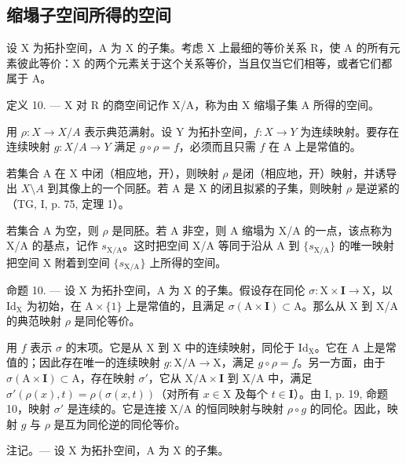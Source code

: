 \subsection{缩塌子空间所得的空间}

设 X 为拓扑空间，A 为 X 的子集。考虑 X 上最细的等价关系 R，使 A 的所有元素彼此等价：X 的两个元素关于这个关系等价，当且仅当它们相等，或者它们都属于 A。

定义 10. --- X 对 R 的商空间记作 X/A，称为由 X 缩塌子集 A 所得的空间。

用 \(\rho\colon X\to X/A\) 表示典范满射。设 Y 为拓扑空间，\(f\colon X\to Y\) 为连续映射。要存在连续映射 \(g\colon X/A\to Y\) 满足 \(g\circ\rho=f\)，必须而且只需 \(f\) 在 A 上是常值的。

若集合 A 在 X 中闭（相应地，开），则映射 \(\rho\) 是闭（相应地，开）映射，并诱导出 \(X\setminus A\) 到其像上的一个同胚。若 A 是 X 的闭且拟紧的子集，则映射 \(\rho\) 是逆紧的（TG, I, p. 75, 定理 1）。

若集合 A 为空，则 \(\rho\) 是同胚。若 A 非空，则 A 缩塌为 X/A 的一点，该点称为 X/A 的基点，记作 \(s_{\mathrm{X / A}}\)。这时把空间 X/A 等同于沿从 A 到 \(\{s_{\mathrm{X / A}}\}\) 的唯一映射把空间 X 附着到空间 \(\{s_{\mathrm{X / A}}\}\) 上所得的空间。

命题 10. --- 设 X 为拓扑空间，A 为 X 的子集。假设存在同伦 \(\sigma: \mathrm{X} \times \mathbf{I} \to \mathrm{X}\)，以 \(\mathrm{Id}_{\mathrm{X}}\) 为初始，在 \(\mathrm{A} \times \{1\}\) 上是常值的，且满足 \(\sigma(\mathrm{A} \times \mathbf{I}) \subset \mathrm{A}\)。那么从 X 到 X/A 的典范映射 \(\rho\) 是同伦等价。

用 \(f\) 表示 \(\sigma\) 的末项。它是从 X 到 X 中的连续映射，同伦于 \(\mathrm{Id}_{\mathrm{X}}\)。它在 A 上是常值的；因此存在唯一的连续映射 \(g \colon \mathrm{X} / \mathrm{A} \to \mathrm{X}\)，满足 \(g \circ \rho = f\)。另一方面，由于 \(\sigma(\mathrm{A} \times \mathbf{I}) \subset \mathrm{A}\)，存在映射 \(\sigma'\)，它从 \(\mathrm{X} / \mathrm{A} \times \mathbf{I}\) 到 \(\mathrm{X} / \mathrm{A}\) 中，满足 \(\sigma'(\rho(x), t) = \rho(\sigma(x, t))\)（对所有 \(x \in \mathrm{X}\) 及每个 \(t \in \mathbf{I}\)）。由 I, p. 19, 命题 10，映射 \(\sigma'\) 是连续的。它是连接 \(\mathrm{X} / \mathrm{A}\) 的恒同映射与映射 \(\rho \circ g\) 的同伦。因此，映射 \(g\) 与 \(\rho\) 是互为同伦逆的同伦等价。

注记。--- 设 X 为拓扑空间，A 为 X 的子集。


